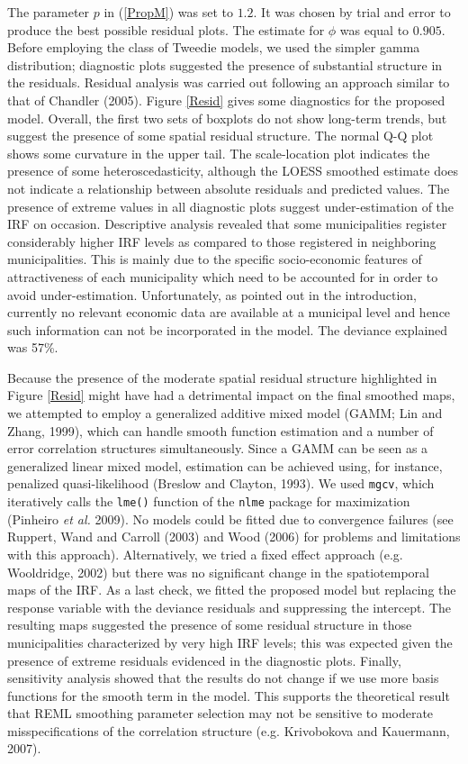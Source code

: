 The parameter $p$ in (\ref{PropM}) was set to $1.2$. It was chosen by trial and error to produce the best possible residual plots. The estimate for $\phi$ was equal to $0.905$. Before employing the class of Tweedie models, we used the simpler gamma distribution; diagnostic plots suggested the presence of substantial structure in the residuals. Residual analysis was carried out following an approach similar to that of Chandler (2005). Figure \ref{Resid} gives some diagnostics for the proposed model. Overall, the first two sets of boxplots do not show long-term trends, but suggest the presence of some spatial residual structure. The normal Q-Q plot shows some curvature in the upper tail. The scale-location plot indicates the presence of some heteroscedasticity, although the LOESS smoothed estimate does not indicate a relationship between absolute residuals and predicted values. The presence of extreme values in all diagnostic plots suggest under-estimation of the IRF on occasion. Descriptive analysis revealed that some municipalities register considerably higher IRF levels as compared to those registered in neighboring municipalities. This is mainly due to the specific socio-economic features of attractiveness of each municipality which need to be accounted for in order to avoid under-estimation. Unfortunately, as pointed out in the introduction, currently no relevant economic data are available at a municipal level and hence such information can not be incorporated in the model. The deviance explained was 57\%. 

Because the presence of the moderate spatial residual structure highlighted in Figure \ref{Resid}  might have had a detrimental impact on the final smoothed maps, we attempted to employ a generalized additive mixed model (GAMM; Lin and Zhang, 1999), which can handle smooth function estimation and a number of error correlation structures simultaneously. Since a GAMM can be seen as a generalized linear mixed model, estimation can be achieved using, for instance, penalized quasi-likelihood (Breslow and Clayton, 1993). We used \texttt{mgcv}, which iteratively calls the \texttt{lme()} function of the \texttt{nlme} package for maximization (Pinheiro \textit{et al.} 2009). No models could be fitted due to convergence failures (see Ruppert, Wand and Carroll (2003) and Wood (2006) for problems and limitations with this approach). Alternatively, we tried a fixed effect approach (e.g. Wooldridge, 2002) but there was no significant change in the spatiotemporal maps of the IRF. As a last check, we fitted the proposed model but replacing the response variable with the deviance residuals and suppressing the intercept. The resulting maps suggested the presence of some residual structure in those municipalities characterized by very high IRF levels; this was expected given the presence of extreme residuals evidenced in the diagnostic plots. Finally, sensitivity analysis showed that the results do not change if we use more basis functions for the smooth term in the model. This supports the theoretical result that REML smoothing parameter selection may not be sensitive to moderate misspecifications of the correlation structure (e.g. Krivobokova and Kauermann, 2007). 

